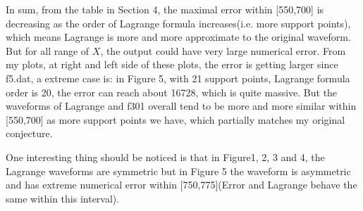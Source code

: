 \documentclass[12pt,a4paper]{article}
\begin{document}
In sum, from the table in Section 4, the maximal error within [550,700] is decreasing as the order of Lagrange formula increases(i.e. more support points), which means Lagrange is more and more approximate to the original waveform. But for all range of $X$, the output could have very large numerical error. From my plots, at right and left side of these plots, the error is getting larger since f5.dat, a extreme case is: in Figure 5, with 21 support points, Lagrange formula order is 20, the error can reach about 16728, which is quite massive. But the waveforms of Lagrange and f301 overall tend to be more and more similar within [550,700] as more support points we have, which partially matches my original conjecture.

One interesting thing should be noticed is that in Figure1, 2, 3 and 4, the Lagrange waveforms are symmetric but in Figure 5 the waveform is asymmetric and has extreme numerical error within [750,775](Error and Lagrange behave the same within this interval). 
\end{document}
